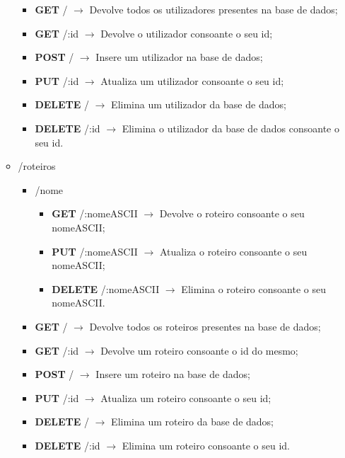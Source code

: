 \begin{itemize}
\begin{itemize}
\begin{itemize}
\begin{itemize}
                \end{itemize}
            \item \textbf{GET} / $\rightarrow$ Devolve todos os utilizadores presentes na base de dados;
            \item \textbf{GET} /:id $\rightarrow$ Devolve o utilizador consoante o seu id;
            \item \textbf{POST} / $\rightarrow$ Insere um utilizador na base de dados;
            \item \textbf{PUT} /:id $\rightarrow$ Atualiza um utilizador consoante o seu id;
            \item \textbf{DELETE} / $\rightarrow$ Elimina um utilizador da base de dados;
            \item \textbf{DELETE} /:id $\rightarrow$ Elimina o utilizador da base de dados consoante o seu id.
        \end{itemize}
        \item /roteiros
        \begin{itemize}
            \item /nome
                \begin{itemize}
                    \item \textbf{GET} /:nomeASCII $\rightarrow$ Devolve o roteiro consoante o seu nomeASCII;
                    \item \textbf{PUT} /:nomeASCII $\rightarrow$ Atualiza o roteiro consoante o seu nomeASCII;
                    \item \textbf{DELETE} /:nomeASCII $\rightarrow$ Elimina o roteiro consoante o seu nomeASCII.
                \end{itemize}
            \item \textbf{GET} / $\rightarrow$ Devolve todos os roteiros presentes na base de dados;
            \item \textbf{GET} /:id $\rightarrow$ Devolve um roteiro consoante o id do mesmo;
            \item \textbf{POST} / $\rightarrow$ Insere um roteiro na base de dados;
            \item \textbf{PUT} /:id $\rightarrow$ Atualiza um roteiro consoante o seu id;
            \item \textbf{DELETE} / $\rightarrow$ Elimina um roteiro da base de dados;
            \item \textbf{DELETE} /:id $\rightarrow$ Elimina um roteiro consoante o seu id.
        \end{itemize}
    \end{itemize}
\end{itemize}
